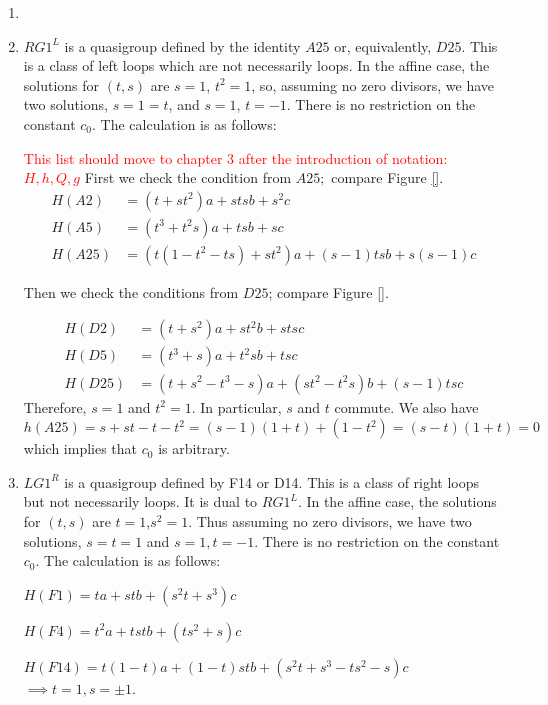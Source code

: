 \documentclass[11pt]{amsart}
\theoremstyle{definition}
\begin{document}
\iffalse
\begin{enumerate}
    \item[(1)] 
    \item[(2)] $RG1^L$ is a quasigroup defined by the identity $A25$ or, equivalently, $D25.$ This is a class of left loops which are not necessarily loops. %
    In the affine case, the solutions for $(t,s)$ are $s=1$, $t^2=1$, so, assuming no zero divisors, we have two solutions, $s=1=t$, and $s=1$, $t=-1$. There is no restriction on the constant $c_0$. The calculation is as follows:


\textcolor{red}{This list should move to chapter 3 after the introduction of notation: $H, h, Q, g$}
First we check the condition from $A25;$ compare Figure \ref{}.
\begin{align*}
    H(A2) & = (t+st^2)a+stsb+s^2c \\
    H(A5) & = (t^3+t^2s)a+tsb+sc \\
    H(A25) & = (t(1-t^2-ts)+st^2)a+(s-1)tsb+s(s-1)c 
\end{align*}



Then we check the conditions from $D25$; compare Figure \ref{}.

\begin{align*}
    H(D2) & = (t+s^2)a+st^2b+stsc \\
    H(D5) & = (t^3+s)a+t^2sb+tsc \\
    H(D25) & = (t+s^2-t^3-s)a + (st^2 -t^2s)b +(s-1)tsc
\end{align*}
Therefore, $s = 1$ and $t^2 =1.$ In particular, $s$ and $t$ commute. We also have $h(A25) = s+st -t -t^2 = (s-1)(1+t)+(1-t^2)= (s-t)(1+t)=0$  which implies that $c_0$ is arbitrary.


    \item[(3)] $LG1^R$ is a quasigroup defined by F14 or D14. This is a class of right loops but not necessarily loops. It is dual to $RG1^L$. In the affine case, the solutions for $(t,s)$ are $t=1$,$s^2=1$. Thus assuming no zero divisors, we have two solutions, $s=t=1$ and $s=1,t=-1$. There is no restriction on the constant $c_0$. The calculation is as follows:
    
    $H(F1) = ta+stb+(s^2t+s^3)c$

    $H(F4) = t^2a+tstb+(ts^2+s)c$

    
    $H(F14) = t(1-t)a+(1-t)stb+(s^2t+s^3-ts^2-s)c$ $\implies t=1, s = \pm 1$.


\end{enumerate}
\end{document}
